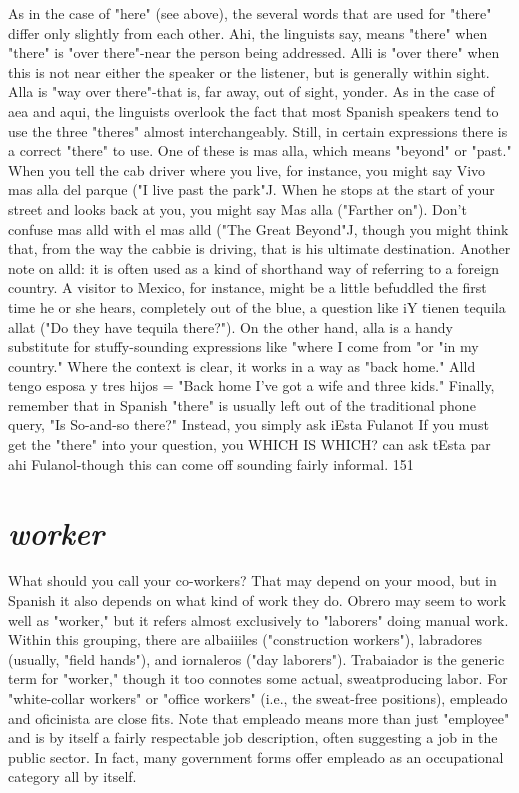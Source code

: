 \documentclass[14pt,a4paper,oneside]{memoir}
\begin{document}
As in the case of "here" (see above), the several words that are
used for "there" differ only slightly from each other. Ahi, the linguists
say, means "there" when "there" is "over there"-near the person
being addressed. Alli is "over there" when this is not near either the
speaker or the listener, but is generally within sight. Alla is "way over
there"-that is, far away, out of sight, yonder. As in the case of aea and
aqui, the linguists overlook the fact that most Spanish speakers tend
to use the three "theres" almost interchangeably.
Still, in certain expressions there is a correct "there" to use.
One of these is mas alla, which means "beyond" or "past." When you
tell the cab driver where you live, for instance, you might say Vivo
mas alla del parque ("I live past the park"J. When he stops at the start
of your street and looks back at you, you might say Mas alla ("Farther
on"). Don't confuse mas alld with el mas alld ("The Great Beyond"J,
though you might think that, from the way the cabbie is driving, that
is his ultimate destination.
Another note on alld: it is often used as a kind of shorthand
way of referring to a foreign country. A visitor to Mexico, for instance,
might be a little befuddled the first time he or she hears, completely
out of the blue, a question like iY tienen tequila allat ("Do they have
tequila there?"). On the other hand, alla is a handy substitute for
stuffy-sounding expressions like "where I come from "or "in my country." Where the context is clear, it works in a way as "back home."
Alld tengo esposa y tres hijos = "Back home I've got a wife and
three kids."
Finally, remember that in Spanish "there" is usually left out of
the traditional phone query, "Is So-and-so there?" Instead, you simply
ask iEsta Fulanot If you must get the "there" into your question, you
WHICH IS WHICH?
can ask tEsta par ahi Fulanol-though this can come off sounding
fairly informal.
151

\section{\emph{worker}}

What should you call your co-workers? That may depend on
your mood, but in Spanish it also depends on what kind of work they
do. Obrero may seem to work well as "worker," but it refers almost
exclusively to "laborers" doing manual work. Within this grouping,
there are albaiiiles ("construction workers"), labradores (usually,
"field hands"), and iornaleros ("day laborers"). Trabaiador is the generic term for "worker," though it too connotes some actual, sweatproducing labor. For "white-collar workers" or "office workers" (i.e.,
the sweat-free positions), empleado and oficinista are close fits. Note
that empleado means more than just "employee" and is by itself a
fairly respectable job description, often suggesting a job in the public
sector. In fact, many government forms offer empleado as an occupational category all by itself.
\end{document}
